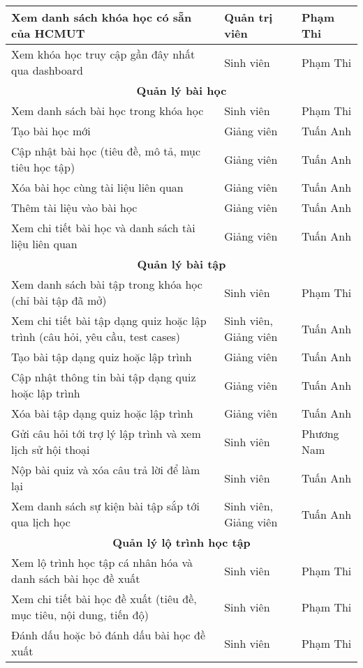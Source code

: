 \begin{longtable}{|p{8cm}|p{3cm}|p{2cm}|}
Xem danh sách khóa học có sẵn của HCMUT & Quản trị viên & Phạm Thi\\ \hline
Xem khóa học truy cập gần đây nhất qua dashboard & Sinh viên & Phạm Thi\\ \hline
\multicolumn{3}{|c|}{\textbf{Quản lý bài học}} \\ \hline
Xem danh sách bài học trong khóa học & Sinh viên & Phạm Thi\\ \hline
Tạo bài học mới & Giảng viên & Tuấn Anh\\ \hline
Cập nhật bài học (tiêu đề, mô tả, mục tiêu học tập) & Giảng viên & Tuấn Anh\\ \hline
Xóa bài học cùng tài liệu liên quan & Giảng viên & Tuấn Anh\\ \hline
Thêm tài liệu vào bài học & Giảng viên & Tuấn Anh\\ \hline
Xem chi tiết bài học và danh sách tài liệu liên quan & Giảng viên & Tuấn Anh\\ \hline
\multicolumn{3}{|c|}{\textbf{Quản lý bài tập}} \\ \hline
Xem danh sách bài tập trong khóa học (chỉ bài tập đã mở) & Sinh viên & Phạm Thi\\ \hline
Xem chi tiết bài tập dạng quiz hoặc lập trình (câu hỏi, yêu cầu, test cases) & Sinh viên, Giảng viên & Tuấn Anh\\ \hline
Tạo bài tập dạng quiz hoặc lập trình & Giảng viên & Tuấn Anh\\ \hline
Cập nhật thông tin bài tập dạng quiz hoặc lập trình & Giảng viên & Tuấn Anh\\ \hline
Xóa bài tập dạng quiz hoặc lập trình & Giảng viên & Tuấn Anh\\ \hline
Gửi câu hỏi tới trợ lý lập trình và xem lịch sử hội thoại & Sinh viên & Phương Nam \\ \hline
Nộp bài quiz và xóa câu trả lời để làm lại & Sinh viên & Tuấn Anh\\ \hline
Xem danh sách sự kiện bài tập sắp tới qua lịch học & Sinh viên, Giảng viên & Tuấn Anh\\ \hline
\multicolumn{3}{|c|}{\textbf{Quản lý lộ trình học tập}} \\ \hline
Xem lộ trình học tập cá nhân hóa và danh sách bài học đề xuất & Sinh viên &  Phạm Thi\\ \hline
Xem chi tiết bài học đề xuất (tiêu đề, mục tiêu, nội dung, tiến độ) & Sinh viên &  Phạm Thi\\ \hline
Đánh dấu hoặc bỏ đánh dấu bài học đề xuất & Sinh viên &  Phạm Thi\\ \hline

\end{longtable}
